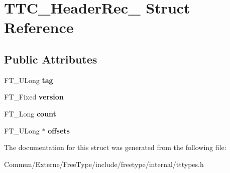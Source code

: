 \hypertarget{struct_t_t_c___header_rec__}{}\section{T\+T\+C\+\_\+\+Header\+Rec\+\_\+ Struct Reference}
\label{struct_t_t_c___header_rec__}
\subsection*{Public Attributes}
\begin{DoxyCompactItemize}
\item 
F\+T\+\_\+\+U\+Long {\bfseries tag}\hypertarget{struct_t_t_c___header_rec___a7fc09906e402f8937b6ca207c84453b4}{}\label{struct_t_t_c___header_rec___a7fc09906e402f8937b6ca207c84453b4}

\item 
F\+T\+\_\+\+Fixed {\bfseries version}\hypertarget{struct_t_t_c___header_rec___aa9ecb33279c68c3c00c1232441da5801}{}\label{struct_t_t_c___header_rec___aa9ecb33279c68c3c00c1232441da5801}

\item 
F\+T\+\_\+\+Long {\bfseries count}\hypertarget{struct_t_t_c___header_rec___a0bf5898e9d8c55bc74f51712a5ad1b58}{}\label{struct_t_t_c___header_rec___a0bf5898e9d8c55bc74f51712a5ad1b58}

\item 
F\+T\+\_\+\+U\+Long $\ast$ {\bfseries offsets}\hypertarget{struct_t_t_c___header_rec___a2ab33f787e8085d7086968fb931060b5}{}\label{struct_t_t_c___header_rec___a2ab33f787e8085d7086968fb931060b5}

\end{DoxyCompactItemize}


The documentation for this struct was generated from the following file\+:\begin{DoxyCompactItemize}
\item 
Commun/\+Externe/\+Free\+Type/include/freetype/internal/tttypes.\+h\end{DoxyCompactItemize}
